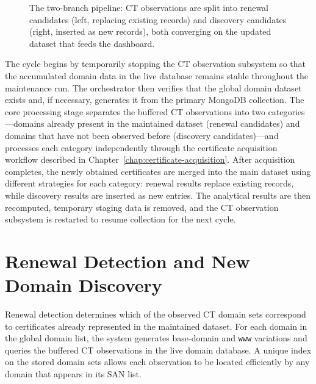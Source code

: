 \begin{figure}[H]
  \caption{The two-branch pipeline: CT observations are split into renewal candidates (left, replacing existing records) and discovery candidates (right, inserted as new records), both converging on the updated dataset that feeds the dashboard.}
  \label{fig:ct-renewal-discovery-branches}
\end{figure}

The cycle begins by temporarily stopping the CT observation subsystem so that
the accumulated domain data in the live database remains stable throughout
the maintenance run. The orchestrator then verifies that the global domain
dataset exists and, if necessary, generates it from the primary MongoDB
collection. The core processing stage separates the buffered CT observations
into two categories---domains already present in the maintained dataset
(renewal candidates) and domains that have not been observed before
(discovery candidates)---and processes each category independently through
the certificate acquisition workflow described in
Chapter~\ref{chap:certificate-acquisition}. After acquisition completes, the
newly obtained certificates are merged into the main dataset using different
strategies for each category: renewal results replace existing records,
while discovery results are inserted as new entries. The analytical results
are then recomputed, temporary staging data is removed, and the CT
observation subsystem is restarted to resume collection for the next cycle.

\section{Renewal Detection and New Domain Discovery}
\label{sec:renewal-and-discovery}

Renewal detection determines which of the observed CT domain sets correspond
to certificates already represented in the maintained dataset. For each
domain in the global domain list, the system generates base-domain and
\texttt{www} variations and queries the buffered CT observations in the live
domain database. A unique index on the stored domain sets allows each
observation to be located efficiently by any domain that appears in its SAN
list.

